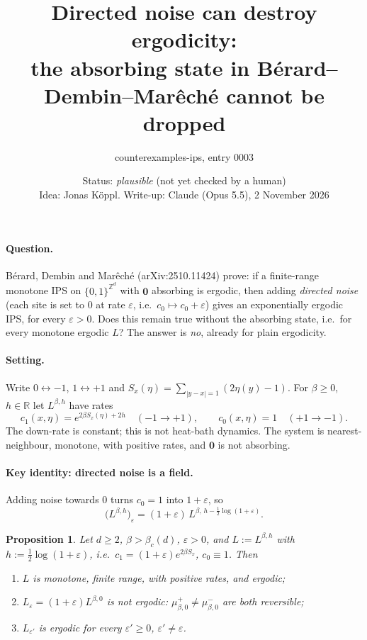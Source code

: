 \documentclass[11pt]{article}
\title{Directed noise can destroy ergodicity:\\ the absorbing state in Bérard--Dembin--Marêché cannot be dropped}
\author{counterexamples-ips, entry 0003}
\date{Status: \emph{plausible} (not yet checked by a human)\\[2pt]\small Idea: Jonas Köppl. Write-up: Claude (Opus 5.5), 2 November 2026}
\newtheorem{proposition}{Proposition}
\theoremstyle{remark}\newtheorem*{remark}{Remark}
\newcommand{\Z}{\mathbb{Z}}
\begin{document}
\maketitle

\paragraph{Question.} Bérard, Dembin and Marêché (arXiv:2510.11424) prove: if a finite-range monotone IPS on $\{0,1\}^{\Z^d}$ with $\mathbf 0$ absorbing is ergodic, then adding \emph{directed noise} (each site is set to $0$ at rate $\varepsilon$, i.e.\ $c_0\mapsto c_0+\varepsilon$) gives an exponentially ergodic IPS, for every $\varepsilon>0$. Does this remain true without the absorbing state, i.e.\ for every monotone ergodic $L$? The answer is \emph{no}, already for plain ergodicity.

\paragraph{Setting.} Write $0\leftrightarrow-1$, $1\leftrightarrow+1$ and $S_x(\eta)=\sum_{|y-x|=1}(2\eta(y)-1)$. For $\beta\ge0$, $h\in\mathbb R$ let $L^{\beta,h}$ have rates
\[
c_1(x,\eta)=e^{2\beta S_x(\eta)+2h}\quad(-1\to+1),\qquad c_0(x,\eta)=1\quad(+1\to-1).
\]
The down-rate is constant; this is not heat-bath dynamics. The system is nearest-neighbour, monotone, with positive rates, and $\mathbf 0$ is not absorbing.

\paragraph{Key identity: directed noise is a field.} Adding noise towards $0$ turns $c_0=1$ into $1+\varepsilon$, so
\[
\bigl(L^{\beta,h}\bigr)_\varepsilon=(1+\varepsilon)\,L^{\beta,\,h-\frac12\log(1+\varepsilon)} .
\]

\begin{proposition}
Let $d\ge2$, $\beta>\beta_c(d)$, $\varepsilon>0$, and $L:=L^{\beta,h}$ with $h:=\frac12\log(1+\varepsilon)$, i.e.\ $c_1=(1+\varepsilon)e^{2\beta S_x}$, $c_0\equiv1$. Then
\begin{enumerate}
\item $L$ is monotone, finite range, with positive rates, and ergodic;
\item $L_\varepsilon=(1+\varepsilon)L^{\beta,0}$ is not ergodic: $\mu^+_{\beta,0}\ne\mu^-_{\beta,0}$ are both reversible;
\item $L_{\varepsilon'}$ is ergodic for every $\varepsilon'\ge0$, $\varepsilon'\ne\varepsilon$.
\end{enumerate}
\end{proposition}
\end{document}
